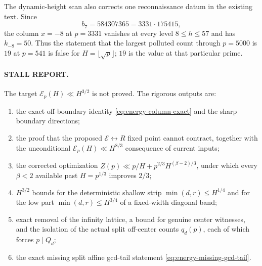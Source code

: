 The dynamic-height scan also corrects one reconnaissance datum in the
existing text.  Since
\[
 b_7=584307365=3331\cdot175415,
\]
the column $x=-8$ at $p=3331$ vanishes at every level
$8\leq h\leq57$ and has $k_{-8}=50$.  Thus the statement that the
largest polluted count through $p=5000$ is $19$ at $p=541$ is false for
$H=\lfloor\sqrt p\rfloor$; $19$ is the value at that particular prime.

\paragraph{STALL REPORT.}
The target $\mathcal E_p(H)\ll H^{3/2}$ is not proved.  The rigorous
outputs are:
\begin{enumerate}
 \item the exact off-boundary identity
       \eqref{eq:energy-column-exact} and the sharp boundary directions;
 \item the proof that the proposed $\mathcal E\leftrightarrow R$ fixed
       point cannot contract, together with the unconditional
       $\mathcal E_p(H)\ll H^{8/3}$ consequence of current inputs;
 \item the corrected optimization
       $Z(p)\ll p/H+p^{2/3}H^{(\beta-2)/3}$, under which every
       $\beta<2$ available past $H=p^{1/3}$ improves $2/3$;
 \item $H^{3/2}$ bounds for the deterministic shallow strip
       $\min(d,r)\leq H^{1/4}$ and for the low part
       $\min(d,r)\leq H^{3/4}$ of a fixed-width diagonal band;
 \item exact removal of the infinity lattice, a bound for genuine center
       witnesses, and the isolation of the actual split off-center counts
       $q_d(p)$, each of which forces $p\mid Q_d$;
 \item the exact missing split affine gcd-tail statement
       \eqref{eq:energy-missing-gcd-tail}.
\end{enumerate}
